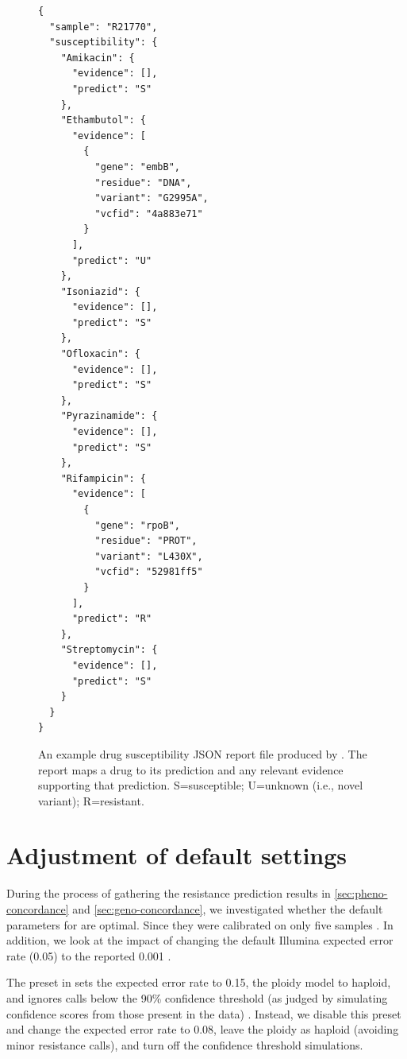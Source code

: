 \begin{figure}
\begin{verbatim}
{
  "sample": "R21770",
  "susceptibility": {
    "Amikacin": {
      "evidence": [],
      "predict": "S"
    },
    "Ethambutol": {
      "evidence": [
        {
          "gene": "embB",
          "residue": "DNA",
          "variant": "G2995A",
          "vcfid": "4a883e71"
        }
      ],
      "predict": "U"
    },
    "Isoniazid": {
      "evidence": [],
      "predict": "S"
    },
    "Ofloxacin": {
      "evidence": [],
      "predict": "S"
    },
    "Pyrazinamide": {
      "evidence": [],
      "predict": "S"
    },
    "Rifampicin": {
      "evidence": [
        {
          "gene": "rpoB",
          "residue": "PROT",
          "variant": "L430X",
          "vcfid": "52981ff5"
        }
      ],
      "predict": "R"
    },
    "Streptomycin": {
      "evidence": [],
      "predict": "S"
    }
  }
}
\end{verbatim}
\caption{An example drug susceptibility JSON report file produced by \drprg{}. The report maps a drug to its prediction and any relevant evidence supporting that prediction. S=susceptible; U=unknown (i.e., novel variant); R=resistant.}
\label{fig:example-drprg-report}
\end{figure}

\section{Adjustment of default \mykrobe{} \ont{} settings}
\label{app:mykrobe-settings}

During the process of gathering the resistance prediction results in \autoref{sec:pheno-concordance} and \autoref{sec:geno-concordance}, we investigated whether the \mykrobe{} default parameters for \ont{} are optimal. Since they were calibrated on only five samples \cite{hunt2019}. In addition, we look at the impact of changing the default Illumina expected error rate (0.05) to the reported 0.001 \cite{manley2016}.

The \ont{} preset in \mykrobe{} sets the expected error rate to 0.15, the ploidy model to haploid, and ignores calls below the 90\% confidence threshold (as judged by simulating confidence scores from those present in the data) \cite{hunt2019}. Instead, we disable this preset and change the expected error rate to 0.08, leave the ploidy as haploid (avoiding minor resistance calls), and turn off the confidence threshold simulations.

